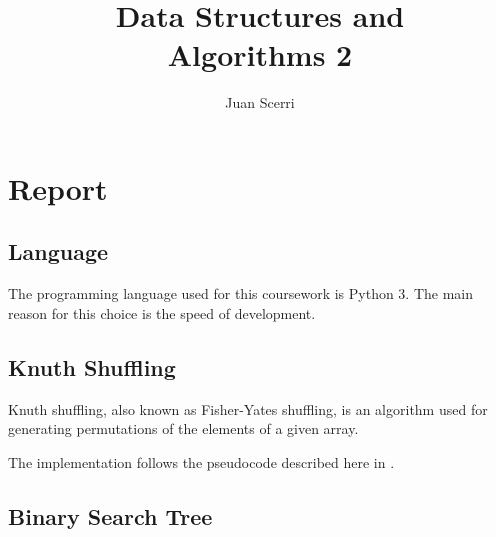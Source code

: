 \documentclass[article]{uom-coursework}
\title{Data Structures and\\Algorithms 2}
\author{Juan Scerri}
\begin{document}

\pagestyle{umpage}

\frontmatter

\maketitle %

\tableofcontents %

\clearpage

\lstlistoflistings

\clearpage

\mainmatter


\chapter*{Report}
\label{chap:report}

\section{Language}

The programming language used for this coursework is Python 3.
The main reason for this choice is the speed of development.

\section{Knuth Shuffling}



Knuth shuffling, also known as Fisher-Yates shuffling, is an
algorithm used for generating permutations of the elements of a
given array.

The implementation follows the pseudocode described here in
\textcite{wikifisheryates}.

\section{Binary Search Tree}
\end{document}
